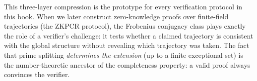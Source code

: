 This three-layer compression is the prototype for every verification protocol in this book. When we later construct zero-knowledge proofs over finite-field trajectories (the ZKPCR protocol), the Frobenius conjugacy class plays exactly the role of a verifier's challenge: it tests whether a claimed trajectory is consistent with the global structure without revealing which trajectory was taken. The fact that prime splitting \emph{determines the extension} (up to a finite exceptional set) is the number-theoretic ancestor of the completeness property: a valid proof always convinces the verifier.



